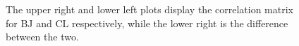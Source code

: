 \documentclass[twocolumn]{\docclass}
\newcommand{\rf}[1]{\ref{fig:#1}}
\begin{document}
	
	
	\begin{figure}
		\caption{The upper right and lower left plots display the correlation matrix for BJ and CL respectively, while the lower right is the difference between the two. \label{fig:tolerance1000}}
	\end{figure}
	

	
	
	
	
	
	
	

	
	
	
	
	
\end{document}
